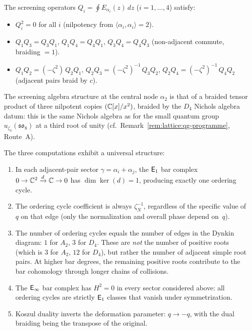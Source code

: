 \begin{computation}[\texorpdfstring{$D_4$}{D_4} at the Coxeter root: \texorpdfstring{$N = 3$}{N = 3}, triality]
The screening operators $Q_i = \oint E_{\alpha_i}(z)\,dz$
($i = 1, \ldots, 4$) satisfy:
\begin{itemize}
\item $Q_i^2 = 0$ for all $i$ (nilpotency from
  $\langle\alpha_i,\alpha_i\rangle = 2$).
\item $Q_1 Q_3 = Q_3 Q_1$, $Q_1 Q_4 = Q_4 Q_1$,
  $Q_3 Q_4 = Q_4 Q_3$ (non-adjacent commute, braiding $= 1$).
\item $Q_1 Q_2 = (-\zeta^2)\, Q_2 Q_1$,
  $Q_2 Q_3 = (-\zeta^2)^{-1}\, Q_3 Q_2$,
  $Q_2 Q_4 = (-\zeta^2)^{-1}\, Q_4 Q_2$
  (adjacent pairs braid by $c$).
\end{itemize}
The screening algebra structure at the central node $\alpha_2$ is that
of a braided tensor product of three nilpotent copies $(\mathbb{C}[x]/x^2)$,
braided by the $D_4$ Nichols algebra datum: this is the same Nichols
algebra as for the small quantum group $u_{\zeta_3}(\mathfrak{so}_8)$
at a third root of unity
(cf.\ Remark~\ref{rem:lattice:qg-programme}, Route~A).
\end{computation}

\begin{remark}
\label{rem:lattice:e1-pattern}
The three computations exhibit a universal structure:
\begin{enumerate}[label=(\roman*)]
\item In each adjacent-pair sector $\gamma = \alpha_i + \alpha_j$,
the $\mathsf{E}_1$ bar complex $0 \to \mathbb{C}^2 \xrightarrow{d} \mathbb{C} \to 0$ has
$\dim\ker(d) = 1$, producing exactly one ordering cycle.
\item The ordering cycle coefficient is always $\zeta_N^{-1}$,
regardless of the specific value of $q$ on that edge
\textup{(}only the normalization and overall phase depend on~$q$\textup{)}.
\item The number of ordering cycles equals the number of edges in the
Dynkin diagram: $1$ for $A_2$, $3$ for $D_4$.  These are \emph{not}
the number of positive roots
(which is $3$ for $A_2$, $12$ for $D_4$),
but rather the number of adjacent simple root pairs.  At higher bar
degrees, the remaining positive roots contribute to the bar cohomology
through longer chains of collisions.
\item The $\mathsf{E}_{\infty}$ bar complex has $H^2 = 0$ in every sector
considered above: all ordering cycles are strictly $\mathsf{E}_1$ classes
that vanish under symmetrization.
\item Koszul duality inverts the deformation parameter: $q \to -q$,
with the dual braiding being the transpose of the original.
\end{enumerate}
\end{remark}


